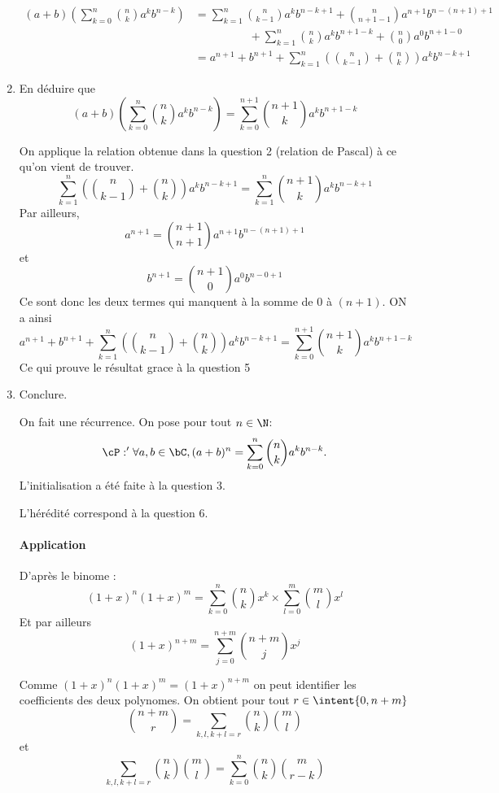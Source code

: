 \begin{correction}
\begin{correction}
\begin{enumerate}
\begin{align*}
(a+b)\left( \sum_{k=0}^n \binom{n}{k}a^k b^{n-k}\right) &= \sum_{k=1}^{n} \binom{n}{k-1}a^{k} b^{n-k+1}+\binom{n}{n+1-1}a^{n+1} b^{n-(n+1)+1} \\& \hspace{2cm} +\sum_{k=1}^{n} \binom{n}{k}a^{k} b^{n+1-k} + \binom{n}{0}a^{0} b^{n+1-0} \\
&=  a^{n+1}+b^{n+1}+\sum_{k=1}^{n} \left( \binom{n}{k-1}+\binom{n}{k}\right)a^{k} b^{n-k+1}
\end{align*}




\item En déduire que 
$$(a+b)\left( \sum_{k=0}^n \binom{n}{k}a^k b^{n-k}\right) = \sum_{k=0}^{n+1}  \binom{n+1}{k}a^{k} b^{n+1-k}$$



On applique la relation obtenue dans la question 2 (relation de Pascal) à ce qu'on vient de trouver. 
$$\sum_{k=1}^{n} \left( \binom{n}{k-1}+\binom{n}{k}\right)a^{k} b^{n-k+1} = \sum_{k=1}^{n} \binom{n+1}{k}a^{k} b^{n-k+1}$$
Par ailleurs, 
$$a^{n+1} = \binom{n+1}{n+1}a^{n+1} b^{n-(n+1)+1}$$
et 
$$b^{n+1} = \binom{n+1}{0}a^{0} b^{n-0+1}$$
Ce sont donc les deux termes qui manquent à la somme de $0$ à $(n+1)$. ON a ainsi 
$$a^{n+1}+b^{n+1}+\sum_{k=1}^{n} \left( \binom{n}{k-1}+\binom{n}{k}\right)a^{k} b^{n-k+1} =\sum_{k=0}^{n+1}  \binom{n+1}{k}a^{k} b^{n+1-k}$$
Ce qui prouve le résultat grace à la question 5




\item Conclure. 



On fait une récurrence. On pose pour tout $n\in \N$:
$$\cP :' \forall a, b\in \bC, (a+b)^n =\sum_{k=0}^n \binom{n}{k}a^k b^{n-k}.$$
L'initialisation a été faite à la question 3.

L'hérédité correspond à la question 6. 

\paragraph{Application }

D'après le binome :
$$(1+x)^n(1+x)^m = \sum_{k=0}^n \binom{n}{k}x^k \times  \sum_{l=0}^m \binom{m}{l}x^l $$
Et par ailleurs 
$$(1+x)^{n+m} =  \sum_{j=0}^{n+m} \binom{n+m}{j}x^j$$

Comme $(1+x)^n(1+x)^m =(1+x)^{n+m}$ on peut identifier les  coefficients des deux polynomes. On obtient pour tout $r\in \intent{0,n+m}$
$$ \binom{n+m}{r} = \sum_{k,l, k+l=r}  \binom{n}{k} \binom{m}{l}$$
et 
$$ \sum_{k,l, k+l=r}  \binom{n}{k} \binom{m}{l} = \sum_{k=0}^n  \binom{n}{k} \binom{m}{r-k}$$





\end{enumerate}
\end{correction}
\end{correction}
